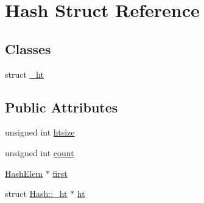 \hypertarget{struct_hash}{\section{Hash Struct Reference}
\label{struct_hash}
}
\subsection*{Classes}
\begin{DoxyCompactItemize}
\item 
struct \hyperlink{struct_hash_1_1__ht}{\-\_\-ht}
\end{DoxyCompactItemize}
\subsection*{Public Attributes}
\begin{DoxyCompactItemize}
\item 
unsigned int \hyperlink{struct_hash_a072258e24a38e09175f1308deb013bc8}{htsize}
\item 
unsigned int \hyperlink{struct_hash_a7ab16f173cdc347ffbe39eaa85ee6fda}{count}
\item 
\hyperlink{struct_hash_elem}{Hash\-Elem} $\ast$ \hyperlink{struct_hash_a2cfc9936ca2a624c6492ab6557f4705b}{first}
\item 
struct \hyperlink{struct_hash_1_1__ht}{Hash\-::\-\_\-ht} $\ast$ \hyperlink{struct_hash_ac0f36e03746a3fe69643db08d93bc0c4}{ht}
\end{DoxyCompactItemize}


